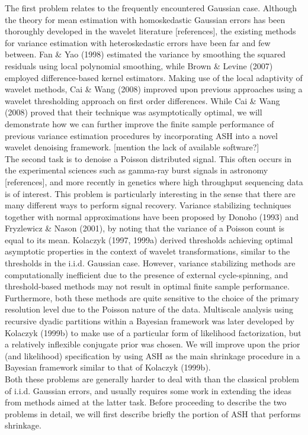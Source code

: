 \documentclass[12pt]{article}
\begin{document}
The first problem relates to the frequently encountered Gaussian case. Although the theory for mean estimation with homoskedastic Gaussian errors has been thoroughly developed in the wavelet literature [references], the existing methods for variance estimation with heteroskedastic errors have been far and few between. Fan \& Yao (1998) estimated the variance by smoothing the squared residuals using local polynomial smoothing, while Brown \& Levine (2007) employed difference-based kernel estimators. Making use of the local adaptivity of wavelet methods, Cai \& Wang (2008) improved upon previous approaches using a wavelet thresholding approach on first order differences. While Cai \& Wang (2008) proved that their technique was asymptotically optimal, we will demonstrate how we can further improve the finite sample performance of previous variance estimation procedures by incorporating ASH into a novel wavelet denoising framework. [mention the lack of available software?]\bigskip\\
The second task is to denoise a Poisson distributed signal. This often occurs in the experimental sciences such as gamma-ray burst signals in astronomy [references], and more recently in genetics where high throughput sequencing data is of interest. This problem is particularly interesting in the sense that there are many different ways to perform signal recovery. Variance stabilizing techniques together with normal approximations have been proposed by Donoho (1993) and Fryzlewicz \& Nason (2001), by noting that the variance of a Poisson count is equal to its mean. Kolaczyk (1997, 1999a) derived thresholds achieving optimal asymptotic properties in the context of wavelet transformations, similar to the thresholds in the i.i.d. Gaussian case.  However, variance stabilizing methods are computationally inefficient due to the presence of external cycle-spinning, and threshold-based methods may not result in optimal finite sample performance. Furthermore, both these methods are quite sensitive to the choice of the primary resolution level due to the Poisson nature of the data. Multiscale analysis using recursive dyadic partitions within a Bayesian framework was later developed by Kolaczyk (1999b) to make use of a particular form of likelihood factorization, but a relatively inflexible conjugate prior was chosen. We will improve upon the prior (and likelihood) specification by using ASH as the main shrinkage procedure in a Bayesian framework similar to that of Kolaczyk (1999b). \bigskip\\
Both these problems are generally harder to deal with than the classical problem of i.i.d. Gaussian errors, and usually requires some work in extending the ideas from methods aimed at the latter task. Before proceeding to describe the two problems in detail, we will first describe briefly the portion of ASH that performs shrinkage. \bigskip\\
\end{document}
